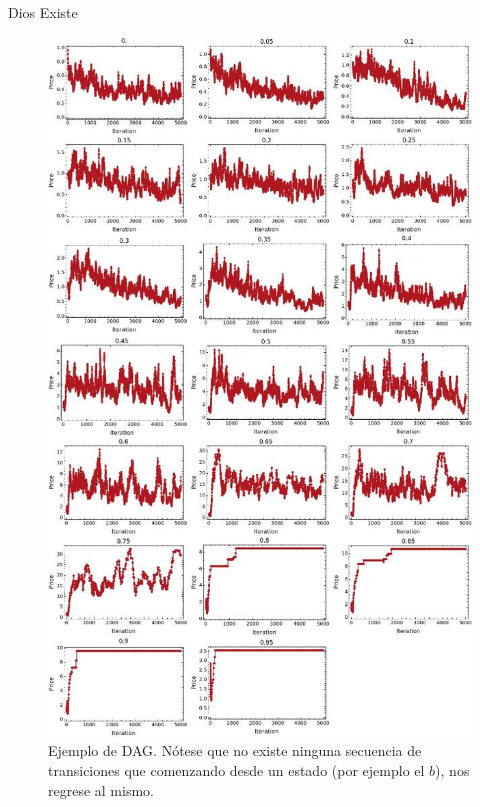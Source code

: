 \markdownRendererInterblockSeparator
{}Dios Existe\markdownRendererInterblockSeparator
{}\begin{figure}[h!] \centering \includegraphics[scale=0.4]{img/price_series.jpeg} \caption{Ejemplo de DAG. Nótese que no existe ninguna secuencia de transiciones que comenzando desde un estado (por ejemplo el $b$), nos regrese al mismo.} \end{figure}\markdownRendererInterblockSeparator
{}\markdownRendererHorizontalRule{}\markdownRendererInterblockSeparator
{}\markdownRendererInterblockSeparator
